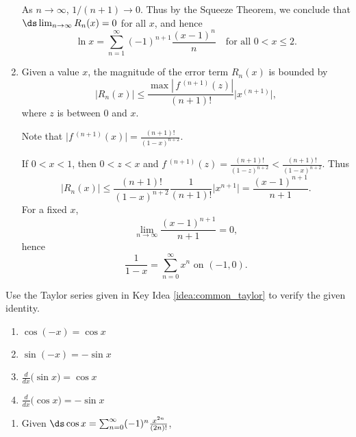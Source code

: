 \begin{enumialphparenastyle}
\begin{ex}
\begin{sol}
\begin{enumerate}
{As $n\to\infty$, $1/(n+1)\to0$. Thus by the Squeeze Theorem, we conclude that $\ds \lim_{n\to\infty} R_n(x) = 0$ for all $x$, and hence
$$\ln x = \sum_{n=1}^\infty (-1)^{n+1}\frac{(x-1)^{n}}{n}\quad \text{for all $0<x\leq 2$}.$$
}
\item 
{Given a value $x$, the magnitude of the error term $R_n(x)$ is bounded by
$$ \big|R_n(x)\big| \leq \frac{\max\left|\,f\,^{(n+1)}(z)\right|}{(n+1)!}\big|x^{(n+1)}\big|,$$
where $z$ is between $0$ and $x$. 

Note that $\big|f\,^{(n+1)}(x)\big| = \frac{(n+1)!}{(1-x)^{n+2}}$. 


If $0<x<1$, then $0<z<x$ and $f\,^{(n+1)}(z) =\frac{(n+1)!}{(1-z)^{n+2}}<\frac{(n+1)!}{(1-x)^{n+2}}$.
Thus
$$ \big|R_n(x)\big| \leq \frac{(n+1)!}{(1-x)^{n+2}}\frac{1}{(n+1)!}\big|x^{n+1}\big|= \frac{(x-1)^{n+1}}{n+1}.$$
For a fixed $x$,
$$\lim_{n\to\infty} \frac{(x-1)^{n+1}}{n+1}=0,$$
hence
$$\frac{1}{1-x} = \sum_{n=0}^\infty x^n \text{ on } (-1,0).$$
 



}
\end{enumerate}
\end{sol}

\end{ex}
\begin{ex}
Use the Taylor series  given in Key Idea \ref{idea:common_taylor} to verify the given identity.
\begin{enumerate}
\item {$\cos(-x) = \cos x$
}
\item {$\sin(-x) = -\sin x$
}
\item {$\frac{d}{dx}\big(\sin x\big) = \cos x$
}
\item {$\frac{d}{dx}\big(\cos x\big) = -\sin x$
}
\end{enumerate}

\begin{sol}
\begin{enumerate}
\item 
{Given $\ds \cos x = \sum_{n=0}^\infty (-1)^n\frac{x^{2n}}{(2n)!}$,

}
\end{enumerate}
\end{sol}
\end{ex}
\end{enumialphparenastyle}
